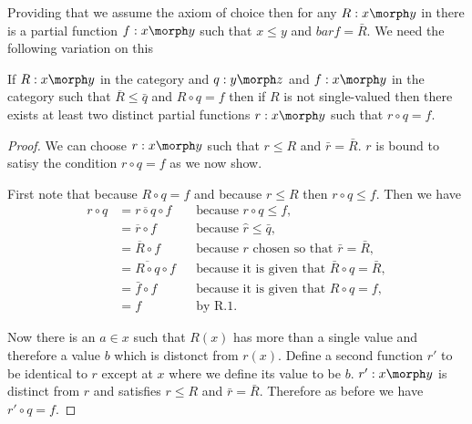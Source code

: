 Providing that we assume the axiom of choice then
for any $R:x \morph y$ in \Rel there is a partial function
$f:x \morph y$ such that $x \leq y$ and $bar{f} = \bar{R}$.
We need the following variation on this 
\begin{lemma}
 If $R: x \morph y$ in the category \Rel and $q:y \morph z$ and $f: x \morph y$ in the category \Par such that $\overline{R} \leq \bar{q}$ and $R \circ q = f$ then 
 if $R$ is not single-valued
 then there exists at least  two distinct partial functions $r: x \morph y$ 
 such that $r \circ q = f$.
 \end{lemma}
 \begin{proof}

We can choose $r:x \morph y$ such that $r \leq R$ and $\bar{r} = \bar{R}$.  $r$ is bound to satisy the condition $r \circ q =f$
as we now show. 

First note that because $R \circ q =f$ and because $r \leq R$
then $r \circ q \leq f$. Then we have 
\begin{align*}
r \circ q 
   &= \overline{r \circ q} \circ f 
          &&\mbox{because $r \circ q \leq f$, } \\
   &= \overline{r} \circ f
          &&\mbox{because $\hat{r} \leq \bar{q}$,} \\
   &= \overline{R} \circ f
     &&\mbox{because $r$ chosen so that $\bar{r} = \bar{R}$,} \\
   &= \overline{R \circ q} \circ f
     &&\mbox{because it is given that $\bar{R} \circ q = \bar{R}$}, \\
   &= \bar{f} \circ f 
          &&\mbox{because it is given that $R \circ q = f$,} \\
   &= f
          &&\mbox{by R.1.} 
\end{align*}

Now there is an $a \in x$ such that $R(x)$ has more than a single value and therefore a value $b$ which is distonct from $r(x)$. Define a second function $r'$ to be identical to
$r$ except at $x$ where we define its value to be $b$.
$r':x \morph y$ is distinct from $r$ and satisfies  
$r \leq R$ and $\bar{r} = \bar{R}$. Therefore as before 
we have $r' \circ q = f$.

\end{proof}


